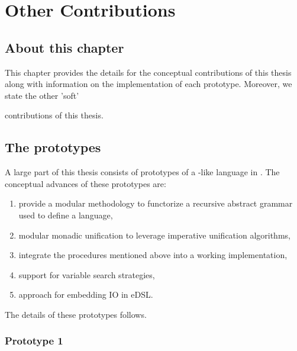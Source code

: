 \documentclass[thesis-solanki.tex]{subfiles}
\begin{document}
\chapter{Other Contributions}\label{chap:accomplishedWork}

\section{About this chapter}\label{sec:what-this-chapter:accomplishedWork}
This chapter provides the details for the conceptual contributions of this thesis along with information on the implementation of each 
prototype. Moreover, we state the other 'soft'


contributions of this thesis.



\section{The prototypes}\label{sec:advances:accomplishedWork}
A large part of this thesis consists of prototypes of a -like language in . The conceptual advances of 
these prototypes are:
\begin{enumerate}
\item provide a modular methodology to functorize a recursive abstract grammar used to define a language,

\item modular monadic unification to leverage imperative unification algorithms,

\item integrate the procedures mentioned above into a working  implementation,

\item support for variable search strategies,

\item approach for embedding IO in eDSL.

\end{enumerate}

The details of these prototypes follows.

\subsection{Prototype 1}
\end{document}
